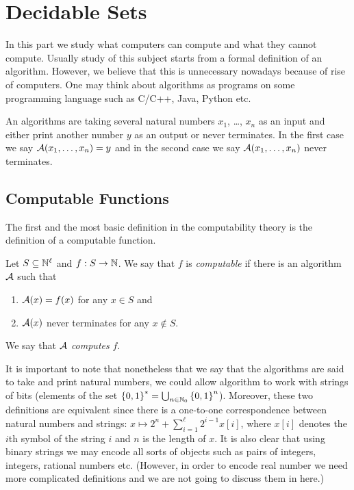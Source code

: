 \chapter{Decidable Sets}
In this part we study what computers can compute and what they cannot compute.
Usually study of this subject starts from a formal definition of an algorithm.
However, we believe that this is unnecessary nowadays because of rise of
computers. One may think about algorithms as programs on some programming
language such as C/C++, Java, Python etc.

An algorithms are taking several natural numbers $x_1$, \dots, $x_n$
as an input and either print another number $y$ as an output or never
terminates. In the first case we say $\mathcal{A}(x_1, \dots, x_n) = y$
and in the second case we say $\mathcal{A}(x_1, \dots, x_n)$ never terminates.

\section{Computable Functions}
The first and the most basic definition in the computability theory is the
definition of a computable function.
\begin{definition}
    Let $S \subseteq {\mathbb{N}}^\ell$ and $f : S \to {\mathbb{N}}$.
    We say that $f$ is \emph{computable} if there is an algorithm
    $\mathcal{A}$ such that
    \begin{enumerate}
        \item $\mathcal{A}(x) = f(x)$ for any $x \in S$ and
        \item $\mathcal{A}(x)$ never terminates for any $x \notin S$.
    \end{enumerate}

    We say that $\mathcal{A}$ \emph{computes} $f$.
\end{definition}

It is important to note that nonetheless that we say that the algorithms are
said to take and print natural numbers, we could allow algorithm to work with
strings of bits (elements of the set
$\strings = \bigcup_{n \in \N_0} \set{0, 1}^n$).
Moreover, these two definitions are  equivalent since there is a one-to-one
correspondence between natural numbers and strings:
$x \mapsto 2^n + \sum_{i = 1}^\ell 2^{i - 1} x[i]$, where $x[i]$ denotes the
$i$th symbol of the string $i$ and $n$ is the length of $x$.
It is also clear that using binary strings we may encode all sorts of objects
such as pairs of integers, integers, rational numbers etc. (However, in order
to encode real number we need more complicated definitions and we are not
going to discuss them in here.)

